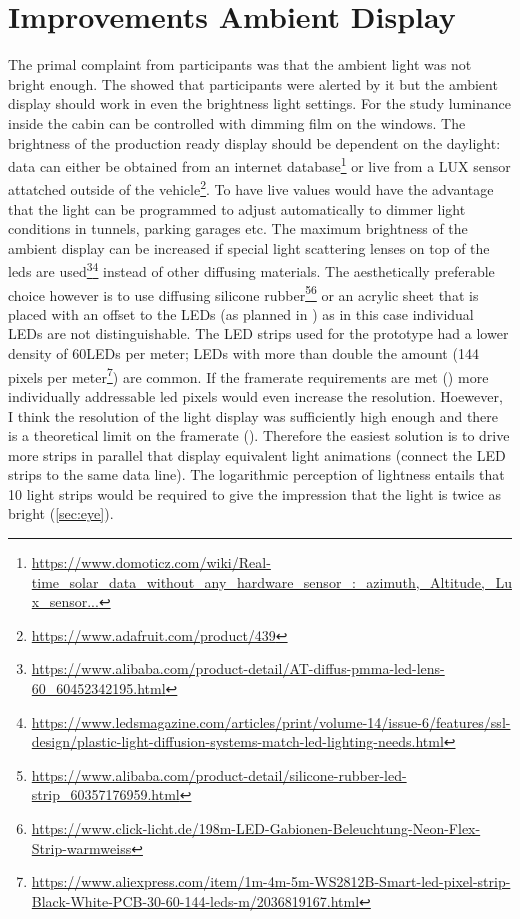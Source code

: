 \section{Improvements Ambient Display}
\label{ImrpoveDisplay}
The primal complaint from participants was that the ambient light was not bright enough. The  showed that participants were alerted by it but the ambient display should work in even the brightness light settings. For the study luminance inside the cabin can be controlled with dimming film on the windows. The brightness of the production ready display should be dependent on the daylight: data can either be obtained from an internet database\footnote{\url{https://www.domoticz.com/wiki/Real-time_solar_data_without_any_hardware_sensor_:_azimuth,_Altitude,_Lux_sensor...}} or live from a LUX sensor attatched outside of the vehicle\footnote{\url{https://www.adafruit.com/product/439}}. To have live values would have the advantage that the light can be programmed to adjust automatically to dimmer light conditions in tunnels, parking garages etc. The maximum brightness of the ambient display can be increased if special light scattering lenses on top of the leds are used\footnote{\url{https://www.alibaba.com/product-detail/AT-diffus-pmma-led-lens-60_60452342195.html}}\fnsep\footnote{\url{https://www.ledsmagazine.com/articles/print/volume-14/issue-6/features/ssl-design/plastic-light-diffusion-systems-match-led-lighting-needs.html}} instead of other diffusing materials. The aesthetically preferable choice however is to use diffusing silicone rubber\footnote{\url{https://www.alibaba.com/product-detail/silicone-rubber-led-strip_60357176959.html}}\fnsep\footnote{\url{https://www.click-licht.de/198m-LED-Gabionen-Beleuchtung-Neon-Flex-Strip-warmweiss}} or an acrylic sheet that is placed with an offset to the LEDs (as planned in ) as in this case individual LEDs are not distinguishable. The LED strips used for the prototype had a lower density of 60LEDs per meter; LEDs with more than double the amount (144 pixels per meter\footnote{\url{https://www.aliexpress.com/item/1m-4m-5m-WS2812B-Smart-led-pixel-strip-Black-White-PCB-30-60-144-leds-m/2036819167.html}}) are common. If the framerate requirements are met () more individually addressable led pixels would even increase the resolution. Hoewever, I think the resolution of the light display was sufficiently high enough and there is a theoretical limit on the framerate (). Therefore the easiest solution is to drive more strips in parallel that display equivalent light animations (connect the LED strips to the same data line). The logarithmic perception of lightness entails that 10 light strips would be required to give the impression that the light is twice as bright (\ref{sec:eye}). %
